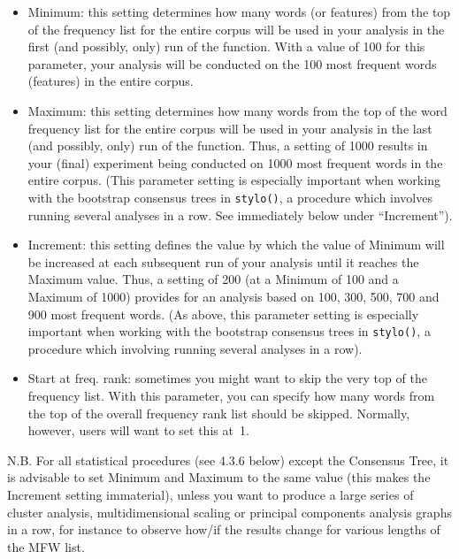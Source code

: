 \documentclass[11pt,a4paper]{article}
\def\margin#1{\marginpar{\textcolor{blue}{\footnotesize\tt #1}}}
\def\code#1{{\tt #1}}
\begin{document}
\begin{itemize}
\item Minimum: this setting determines how many words (or features) from
the top of the frequency list for the entire corpus will be used in
your analysis in the first (and possibly, only) run of the function.
With a value of 100 for this parameter, your analysis will be conducted
on the 100 most frequent words (features) in the entire corpus.\margin{mfw.min=}\margin{<integer>} 

\item Maximum: this setting determines how many words from the top of the
word frequency list for the entire corpus will be used in your analysis
in the last (and possibly, only) run of the function. Thus, a setting
of 1000 results in your (final) experiment being conducted on 1000
most frequent words in the entire corpus.\margin{mfw.max=}\margin{<integer>}
(This parameter setting is especially important when working with
the bootstrap consensus trees in \code{stylo()}, a procedure which
involves running several analyses in a row. See immediately below
under ``Increment''). 

\item Increment: this setting defines the value by which the value of Minimum
will be increased at each subsequent run of your analysis until it
reaches the Maximum value. Thus, a setting of 200 (at a Minimum of
100 and a Maximum of 1000) provides for an analysis based on 100,
300, 500, 700 and 900 most frequent words.\margin{mfw.incr=}\margin{<integer>}
(As above, this parameter setting is especially important when working
with the bootstrap consensus trees in \code{stylo()}, a procedure
which involving running several analyses in a row). 

\item Start at freq. rank: sometimes you might want to skip the very top
of the frequency list\margin{start.at=}\margin{<integer>}.
With this parameter, you can specify how many words from the top of
the overall frequency rank list should be skipped. Normally, however,
users will want to set this at~1. 
\end{itemize}

N.B. For all statistical procedures (see 4.3.6 below) except the Consensus
Tree, it is advisable to set Minimum and Maximum to the same value
(this makes the Increment setting immaterial), unless you want to
produce a large series of cluster analysis, multidimensional scaling
or principal components analysis graphs in a row, for instance to
observe how/if the results change for various lengths of the MFW list.
\end{document}
